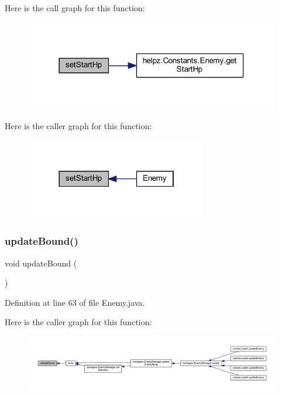 Here is the call graph for this function\+:\nopagebreak
\begin{figure}[H]
\begin{center}
\leavevmode
\includegraphics[width=316pt]{classenemies_1_1_enemy_a36ff8539de48d58a670cd19251abe658_cgraph}
\end{center}
\end{figure}
Here is the caller graph for this function\+:\nopagebreak
\begin{figure}[H]
\begin{center}
\leavevmode
\includegraphics[width=226pt]{classenemies_1_1_enemy_a36ff8539de48d58a670cd19251abe658_icgraph}
\end{center}
\end{figure}
\mbox{\label{classenemies_1_1_enemy_aff695491d98058a8b62a30d4484083bc}} 
\subsubsection{\texorpdfstring{update\+Bound()}{updateBound()}}
{\footnotesize\ttfamily void update\+Bound (\begin{DoxyParamCaption}{ }\end{DoxyParamCaption})}



Definition at line 63 of file Enemy.\+java.

Here is the caller graph for this function\+:\nopagebreak
\begin{figure}[H]
\begin{center}
\leavevmode
\includegraphics[width=350pt]{classenemies_1_1_enemy_aff695491d98058a8b62a30d4484083bc_icgraph}
\end{center}
\end{figure}


